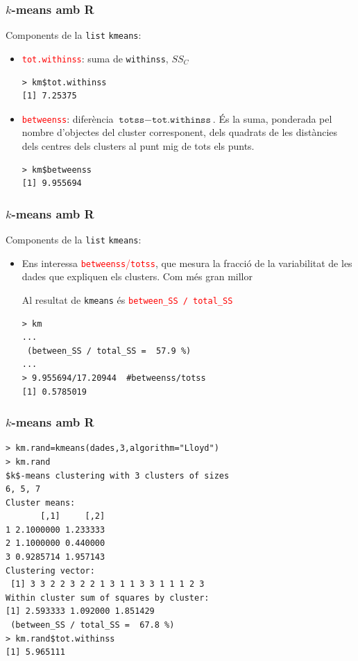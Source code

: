 \documentclass[12pt,t]{beamer}
\newcommand{\red}[1]{\textcolor{red}{#1}}
\theoremstyle{plain}
\theoremstyle{definition}
\begin{document}
\begin{frame}[fragile]
\frametitle{$k$-means amb R}
Components de la \texttt{list} \texttt{kmeans}:

\begin{itemize}
\item \red{\texttt{tot.withinss}}: suma de \texttt{withinss}, $SS_C$
\begin{verbatim}
> km$tot.withinss  
[1] 7.25375
\end{verbatim}
\item \red{\texttt{betweenss}}: diferència  $\texttt{totss}- \texttt{tot.withinss}$. És la suma, ponderada pel nombre d'objectes del cluster corresponent, dels quadrats de les distàncies dels centres dels clusters al punt mig de tots els punts.
\begin{verbatim}
> km$betweenss   
[1] 9.955694
\end{verbatim}
\end{itemize}
\end{frame}

\begin{frame}[fragile]
\frametitle{$k$-means amb R}
Components de la \texttt{list} \texttt{kmeans}:

\begin{itemize}
\item Ens interessa \red{\texttt{betweenss}/\texttt{totss}}, que mesura la fracció de la variabilitat de les dades que expliquen els clusters. Com més gran millor

Al resultat de \texttt{kmeans} és \red{\texttt{between\_{}SS / total\_{}SS}}
\begin{verbatim}
> km
...
 (between_SS / total_SS =  57.9 %)
...
> 9.955694/17.20944  #betweenss/totss
[1] 0.5785019
\end{verbatim}

\end{itemize}
\end{frame}





\begin{frame}[fragile]
\frametitle{$k$-means amb R}
\vspace*{-2ex}

 
\begin{verbatim}
> km.rand=kmeans(dades,3,algorithm="Lloyd")
> km.rand
$k$-means clustering with 3 clusters of sizes 
6, 5, 7
Cluster means:
       [,1]     [,2]
1 2.1000000 1.233333
2 1.1000000 0.440000
3 0.9285714 1.957143
Clustering vector:
 [1] 3 3 2 2 3 2 2 1 3 1 1 3 3 1 1 1 2 3
Within cluster sum of squares by cluster:
[1] 2.593333 1.092000 1.851429
 (between_SS / total_SS =  67.8 %)
> km.rand$tot.withinss
[1] 5.965111
\end{verbatim}
\end{frame}
\end{document}
